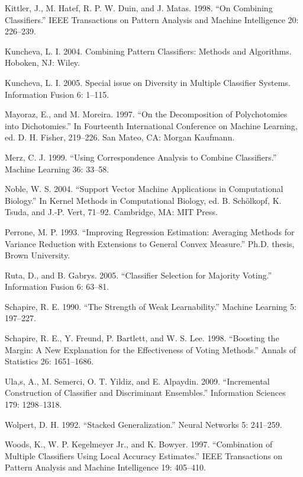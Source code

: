 Kittler, J., M. Hatef, R. P. W. Duin, and J. Matas. 1998. “On Combining Classifiers.” IEEE Transactions on Pattern Analysis and Machine Intelligence 20: 226--239.

Kuncheva, L. I. 2004. Combining Pattern Classifiers: Methods and Algorithms. Hoboken, NJ: Wiley.

Kuncheva, L. I. 2005. Special issue on Diversity in Multiple Classifier Systems. Information Fusion 6: 1--115.

Mayoraz, E., and M. Moreira. 1997. “On the Decomposition of Polychotomies into Dichotomies.” In Fourteenth International Conference on Machine Learning, ed. D. H. Fisher, 219--226. San Mateo, CA: Morgan Kaufmann.

Merz, C. J. 1999. “Using Correspondence Analysis to Combine Classifiers.” Machine Learning 36: 33--58.

Noble, W. S. 2004. “Support Vector Machine Applications in Computational Biology.” In Kernel Methods in Computational Biology, ed. B. Schölkopf, K. Tsuda, and J.-P. Vert, 71--92. Cambridge, MA: MIT Press.

Perrone, M. P. 1993. “Improving Regression Estimation: Averaging Methods for Variance Reduction with Extensions to General Convex Measure.” Ph.D. thesis, Brown University.

Ruta, D., and B. Gabrys. 2005. “Classifier Selection for Majority Voting.” Information Fusion 6: 63--81.

Schapire, R. E. 1990. “The Strength of Weak Learnability.” Machine Learning 5: 197--227.

Schapire, R. E., Y. Freund, P. Bartlett, and W. S. Lee. 1998. “Boosting the Margin: A New Explanation for the Effectiveness of Voting Methods.” Annals of Statistics 26: 1651--1686.

Ula,s, A., M. Semerci, O. T. Yildiz, and E. Alpaydin. 2009. “Incremental Construction of Classifier and Discriminant Ensembles.” Information Sciences 179: 1298--1318.

Wolpert, D. H. 1992. “Stacked Generalization.” Neural Networks 5: 241--259.

Woods, K., W. P. Kegelmeyer Jr., and K. Bowyer. 1997. “Combination of Multiple Classifiers Using Local Accuracy Estimates.” IEEE Transactions on Pattern Analysis and Machine Intelligence 19: 405--410.
